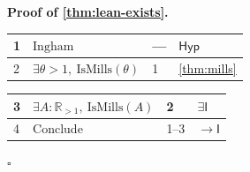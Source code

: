 \documentclass[11pt,reqno]{amsart}
\theoremstyle{blueplain}
\renewcommand{\qedsymbol}{\textcolor{proofqed}{\ensuremath{\square}}}
\renewenvironment{proof}[1][Proof]{\par\noindent\textbf{\textcolor{proofhead}{#1.}}\par\nobreak}{\par\nobreak\hfill\qedsymbol}
\numberwithin{equation}{section}
\begin{document}
\begin{proof}[\textbf{Proof of \cref{thm:lean-exists}}]
\label{proof:lean-exists}
{\scriptsize
\begin{tabular}{|m{0.7cm}|m{12cm}|m{1.4cm}|m{2.5cm}|}
\hline
1 & $\text{Ingham}$ & --- & $\mathsf{Hyp}$ \\ \hline
2 & $\exists\theta>1,\ \mathrm{IsMills}(\theta)$ & 1 & \cref{thm:mills} \\
\end{tabular}%
\noindent \newline
\noindent
\begin{tabular}{|m{0.7cm}|m{12cm}|m{1.4cm}|m{2.5cm}|}
\hline
3 & $\exists A:\mathbb{R}_{>1},\ \mathrm{IsMills}(A)$ & 2 & $\exists\mathsf{I}$ \\ \hline
4 & Conclude & 1--3 & $\rightarrow\mathsf{I}$ \\
\end{tabular}%
}
\end{proof}
\end{document}
